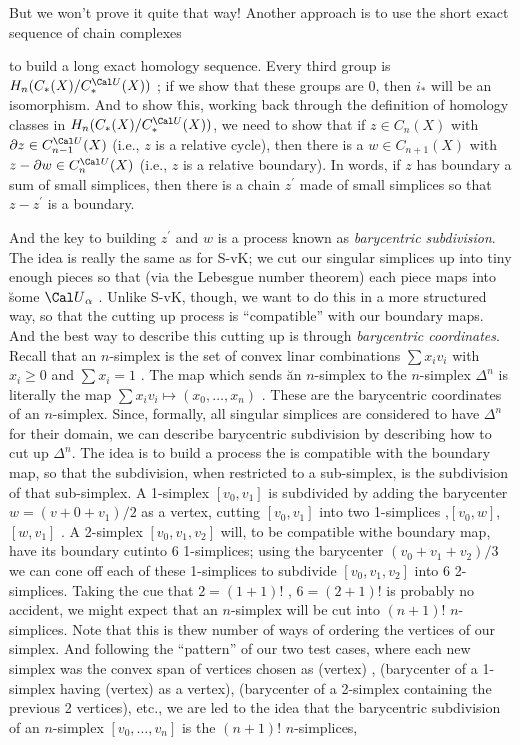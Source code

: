 \msk

But we won't prove it quite that way! Another approach is to use the short exact sequence of chain 
complexes

\ssk


\ssk

to build a long exact homology sequence. Every third group is $H_n(C_*(X)/C_*^{\Cal U}(X))$ ;
if we show that these groups are $0$, then $i_*$ will be an isomorphism. And to show \u{this},
working back through the definition of homology classes in $H_n(C_*(X)/C_*^{\Cal U}(X))$,
we need to show that if $z\in C_n(X)$ with $\del z\in C_{n-1}^{\Cal U}(X)$ (i.e., $z$ is a relative cycle), 
then there is a $w\in C_{n+1}(X)$ with $z-\del w\in C_n^{\Cal U}(X)$ (i.e., $z$ is a relative boundary).
In words, if $z$ has boundary a sum of small simplices, then there is a chain $z^\prime$
made of small simplices so that $z-z^\prime$ is a boundary.

\ssk

And the key to building $z^\prime$ and $w$ is a process known as {\it barycentric subdivision}.
The idea is really the same as for S-vK; we cut our singular simplices up into tiny enough
pieces so that (via the Lebesgue number theorem) 
each piece maps into \u{some} ${\Cal U}_\alpha$ . Unlike S-vK, though, we want to do 
this in a more structured way, so that the cutting up process is ``compatible'' with our
boundary maps. And the best way to describe this cutting up is through {\it barycentric
coordinates}. Recall that an $n$-simplex is the set of convex linar combinations
$\sum x_i v_i$ with $x_i\geq 0$ and $\sum x_i=1$ . The map which sends \u{an}
$n$-simplex to \u{the} $n$-simplex $\Delta^n$ is literally the map 
$\sum x_i v_i \mapsto (x_0,\ldots ,x_n)$ . These are the barycentric coordinates of an $n$-simplex.
Since, formally, all singular simplices are considered to have $\Delta^n$ for their
domain, we can describe barycentric subdivision by describing how to cut up $\Delta^n$.
The idea is to build a process the is compatible with the boundary map, so that the
subdivision, when restricted to a sub-simplex, is the subdivision of that sub-simplex.
A 1-simplex $[v_0,v_1]$ is subdivided by adding the barycenter $w=(v+0+v_1)/2$ as a vertex,
cutting $[v_0,v_1]$ into two 1-simplices ,$[v_0,w]$,$[w,v_1]$ . A 2-simplex 
$[v_0,v_1,v_2]$ will, to be compatible withe boundary map,
have its boundary cutinto 6 1-simplices; using the barycenter $(v_0+v_1+v_2)/3$
we can cone off each of these 1-simplices to subdivide $[v_0,v_1,v_2]$
into 6 2-simplices. Taking the cue that $2=(1+1)!$ , $6=(2+1)!$ is probably no accident, we
might expect that an $n$-simplex will be cut into $(n+1)!$ $n$-simplices. 
Note that this is thew number of ways of ordering the vertices of our simplex. 
And following the ``pattern'' of our two test cases, where each new simplex was the convex
span of vertices chosen as (vertex) , (barycenter of a 1-simplex having (vertex) as a vertex),
(barycenter of a 2-simplex containing the previous 2 vertices), etc., we are led to the idea that
the barycentric subdivision of an $n$-simplex $[v_0,\ldots , v_n]$ is the 
$(n+1)!$ $n$-simplices, 

